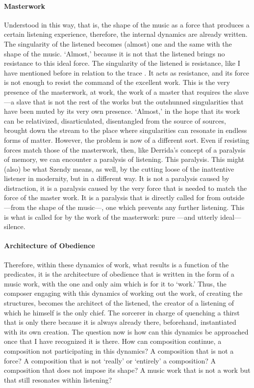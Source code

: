 \paragraph{Masterwork}
Understood in this way, that is, the shape of the music as a force that produces a certain listening experience, therefore, the internal dynamics are already written. The singularity of the listened becomes (almost) one and the same with the shape of the music. `Almost,' because it is not that the listened brings no resistance to this ideal force. The singularity of the listened is resistance, like I have mentioned before in relation to the trace . It acts as resistance, and its force is not enough to resist the command of the excellent work. This is the very presence of the masterwork, at work, the work of a master that requires the slave ---a slave that is not the rest of the works but the outshunned singularities that have been muted by its very own presence. `Almost,' in the hope that its work can be relativized, disarticulated, disentangled from the source of sources, brought down the stream to the place where singularities can resonate in endless forms of matter. However, the problem is now of a different sort. Even if resisting forces match those of the masterwork, then, like Derrida's concept of a paralysis of memory, we can encounter a paralysis of listening. This paralysis. This might (also) be what Szendy means, as well, by the cutting loose of the inattentive listener in modernity, but in a different way. It is not a paralysis caused by distraction, it is a paralysis caused by the very force that is needed to match the force of the master work. It is a paralysis that is directly called for from outside ---from the shape of the music---, one which prevents any further listening. This is what is called for by the work of the masterwork: pure ---and utterly ideal--- silence.

\paragraph{Architecture of Obedience}
Therefore, within these dynamics of work, what results is a function of the predicates, it is the architecture of obedience that is written in the form of a music work, with the one and only aim which is for it to `work.' Thus, the composer engaging with this dynamics of working out the work, of creating the structures, becomes the architect of the listened, the creator of a listening of which he himself is the only chief. The sorcerer in charge of quenching a thirst that is only there because it is always already there, beforehand, instantiated with its own creation. The question now is how can this dynamics be approached once that I have recognized it is there. How can composition continue, a composition not participating in this dynamics? A composition that is not a force? A composition that is not `really' or `entirely' a composition? A composition that does not impose its shape? A music work that is not a work but that still resonates within listening?


